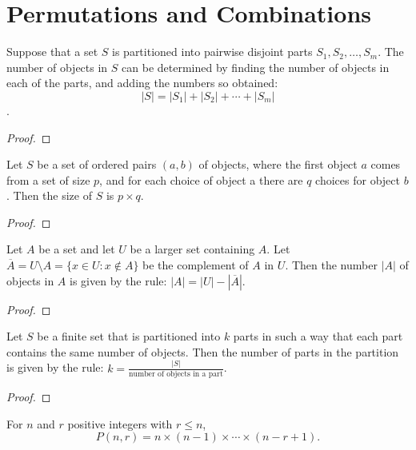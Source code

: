 \chapter{Permutations and Combinations}

\begin{theorem}
  \label{thm:2.1.1}
  \leanok
  Suppose that a set $S$ is partitioned into pairwise disjoint parts $S_1,S_2,
  \ldots, S_m$. The number of objects in $S$ can be determined by finding the number of objects in each
  of the parts, and adding the numbers so obtained:  $$ |S| = |S_1| + |S_2| + \cdots + |S_m| $$.
\end{theorem}
\begin{proof}
  \leanok
\end{proof}

\begin{theorem}
  \label{thm:2.1.2}
  \leanok
  Let $S$ be a set of ordered pairs $(a, b)$ of objects, where the first object $a$ comes from a set of 
  size $p$, and for each choice of object a there are $q$ choices for object $b$. Then
  the size of $S$ is $p \times q$.
\end{theorem}
\begin{proof}
  \leanok
\end{proof}

\begin{theorem}
  \label{thm:2.1.3}
  \leanok
  Let $A$ be a set and let $U$ be a larger set containing $A$. Let $\overline{A} = U
  \setminus A = \{ x \in U : x \notin A \}$ be the complement of $A$ in $U$. Then the number $|A|$ of
  objects in $A$ is given by the rule: $|A| = |U| - |\overline{A}|$.
\end{theorem}
\begin{proof}
  \leanok
\end{proof}

\begin{theorem}
  \label{thm:2.1.4}
  \leanok
  Let $S$ be a finite set that is partitioned into $k$ parts in such a way that each
  part contains the same number of objects. Then the number of parts in the partition is given by the
  rule: $k = \frac{|S|}{\text{number of objects in a part}}$.
\end{theorem}
\begin{proof}
  \leanok
\end{proof}

\begin{theorem}
    \label{thm:2.2.1}
    For $n$ and $r$ positive integers with $r\leq n$,
    \[P(n,r) = n\times(n-1)\times\cdots\times(n-r+1).\]  
\end{theorem} 

